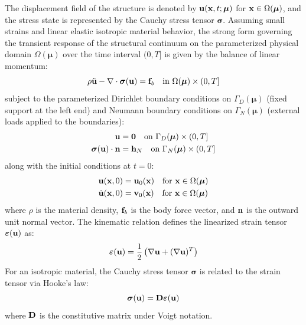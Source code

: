 The displacement field of the structure is denoted by $\mathbf{u}(\mathbf{x}, t; \boldsymbol{\mu})$ for $\mathbf{x} \in \Omega(\boldsymbol{\mu})$, and the stress state is represented by the Cauchy stress tensor $\boldsymbol{\sigma}$.
Assuming small strains and linear elastic isotropic material behavior, the strong form governing the transient response of the structural continuum on the parameterized physical domain $\Omega(\boldsymbol{\mu})$ over the time interval $(0, T]$ is given by the balance of linear momentum:
\begin{equation}
    \rho \ddot{\mathbf{u}} - \nabla \cdot \boldsymbol{\sigma}(\mathbf{u}) = \mathbf{f}_b \quad \text{in } \Omega(\boldsymbol{\mu}) \times (0, T]
\end{equation}
subject to the parameterized Dirichlet boundary conditions on $\Gamma_D(\boldsymbol{\mu})$ (fixed support at the left end) and Neumann boundary conditions on $\Gamma_N(\boldsymbol{\mu})$ (external loads applied to the boundaries):
\begin{align}
    \mathbf{u}                                     & = \mathbf{0} \quad \text{on } \Gamma_D(\boldsymbol{\mu}) \times (0, T]   \\
    \boldsymbol{\sigma}(\mathbf{u}) \cdot \mathbf{n} & = \mathbf{h}_N \quad \text{on } \Gamma_N(\boldsymbol{\mu}) \times (0, T]
\end{align}
along with the initial conditions at $t = 0$:
\begin{align}
    \mathbf{u}(\mathbf{x}, 0)       & = \mathbf{u}_0(\mathbf{x}) \quad \text{for } \mathbf{x} \in \Omega(\boldsymbol{\mu}) \\
    \dot{\mathbf{u}}(\mathbf{x}, 0) & = \mathbf{v}_0(\mathbf{x}) \quad \text{for } \mathbf{x} \in \Omega(\boldsymbol{\mu})
\end{align}
where $\rho$ is the material density, $\mathbf{f}_b$ is the body force vector, and $\mathbf{n}$ is the outward unit normal vector. The kinematic relation defines the linearized strain tensor $\boldsymbol{\varepsilon}(\mathbf{u})$ as:
\begin{equation}
    \boldsymbol{\varepsilon}(\mathbf{u}) = \frac{1}{2}\left(\nabla\mathbf{u} + (\nabla\mathbf{u})^T\right)
\end{equation}
For an isotropic material, the Cauchy stress tensor $\boldsymbol{\sigma}$ is related to the strain tensor via Hooke's law:
\begin{equation}
    \boldsymbol{\sigma}(\mathbf{u}) = \mathbf{D} \boldsymbol{\varepsilon}(\mathbf{u})
\end{equation}
where $\mathbf{D}$ is the constitutive matrix under Voigt notation.



